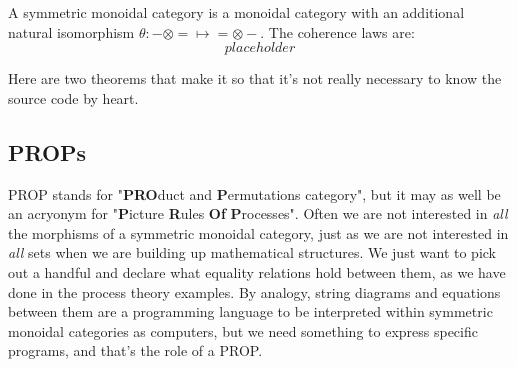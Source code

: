 \begin{defn}
A symmetric monoidal category is a monoidal category with an additional natural isomorphism $\theta: - \otimes = \mapsto = \otimes -$. The coherence laws are:
\[placeholder\]
\end{defn}

Here are two theorems that make it so that it's not really necessary to know the source code by heart.

\begin{theorem}[Strictification]

\end{theorem}

\begin{theorem}[Graphical?]

\end{theorem}

\subsection{PROPs}

PROP stands for "\textbf{PRO}duct and \textbf{P}ermutations category", but it may as well be an acryonym for "\textbf{P}icture \textbf{R}ules \textbf{Of} \textbf{P}rocesses". Often we are not interested in \emph{all} the morphisms of a symmetric monoidal category, just as we are not interested in \emph{all} sets when we are building up mathematical structures. We just want to pick out a handful and declare what equality relations hold between them, as we have done in the process theory examples. By analogy, string diagrams and equations between them are a programming language to be interpreted within symmetric monoidal categories as computers, but we need something to express specific programs, and that's the role of a PROP.

\begin{defn}

\end{defn}

